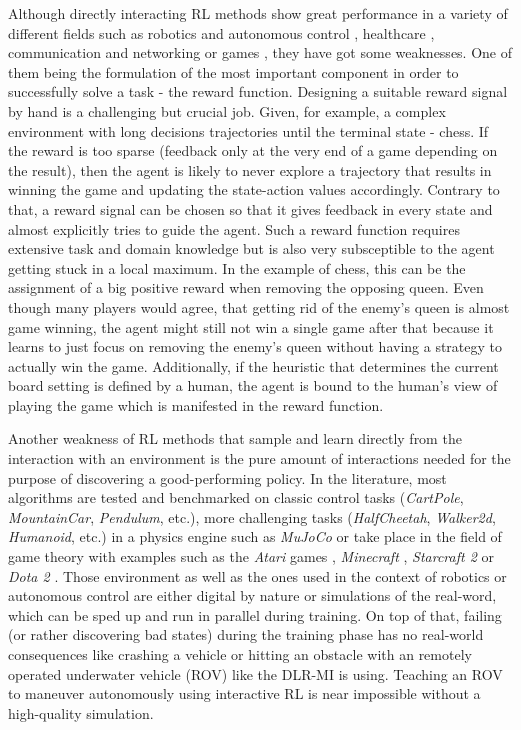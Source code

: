 Although directly interacting RL methods show great performance in a variety of different fields such as robotics and autonomous control \cite[]{etemad2020using, patil2021deep, wang2018reinforcement}, healthcare \cite[]{tseng2017deep, yu2019incorporating},  communication and networking \cite[]{chinchali2018cellular, fadlullah2017state}  or games \cite[]{berner2019dota, mnih2013playing, wu2016training}, they have got some weaknesses. One of them being the formulation of the most important component in order to successfully solve a task - the reward function. Designing a suitable reward signal by hand is a challenging but crucial job. Given, for example, a complex environment with long decisions trajectories until the terminal state - chess. If the reward is too sparse (feedback only at the very end of a game depending on the result), then the agent is likely to never explore a trajectory that results in winning the game and updating the state-action values accordingly. Contrary to that, a reward signal can be chosen so that it gives feedback in every state and almost explicitly tries to guide the agent. Such a reward function requires extensive task and domain knowledge but is also very subsceptible to the agent getting stuck in a local maximum. In the example of chess, this can be the assignment of a big positive reward when removing the opposing queen. Even though many players would agree, that getting rid of the enemy's queen is almost game winning, the agent might still not win a single game after that because it learns to just focus on removing the enemy's queen without having a strategy to actually win the game. Additionally, if the heuristic that determines the current board setting is defined by a human, the agent is bound to the human's view of playing the game which is manifested in the reward function. 
\par
Another weakness of RL methods that sample and learn directly from the interaction with an environment is the pure amount of interactions needed for the purpose of discovering a good-performing policy. In the literature, most algorithms are tested and benchmarked on classic control tasks (\textit{CartPole}, \textit{MountainCar}, \textit{Pendulum}, etc.), more challenging tasks (\textit{HalfCheetah}, \textit{Walker2d}, \textit{Humanoid}, etc.) in a physics engine such as \textit{MuJoCo} \cite[]{todorov2012mujoco} or take place in the field of game theory with examples such as the \textit{Atari} games \cite[]{mnih2013playing}, \textit{Minecraft} \cite[]{johnson2016malmo}, \textit{Starcraft 2} \cite[]{vinyals2019grandmaster} or \textit{Dota 2} \cite[]{berner2019dota}. Those environment as well as the ones used in the context of robotics or autonomous control are either digital by nature or simulations of the real-word, which can be sped up and run in parallel during training. On top of that, failing (or rather discovering bad states) during the training phase has no real-world consequences like crashing a vehicle or hitting an obstacle with an remotely operated underwater vehicle (ROV) like the DLR-MI is using. Teaching an ROV to maneuver autonomously using interactive RL is near impossible without a high-quality simulation.
